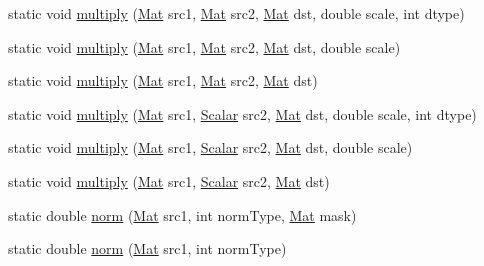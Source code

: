 \begin{DoxyCompactItemize}
static void \mbox{\hyperlink{classorg_1_1opencv_1_1core_1_1_core_aa49b10c74b442ec7cc890f9ce812918a}{multiply}} (\mbox{\hyperlink{classorg_1_1opencv_1_1core_1_1_mat}{Mat}} src1, \mbox{\hyperlink{classorg_1_1opencv_1_1core_1_1_mat}{Mat}} src2, \mbox{\hyperlink{classorg_1_1opencv_1_1core_1_1_mat}{Mat}} dst, double scale, int dtype)
\item 
static void \mbox{\hyperlink{classorg_1_1opencv_1_1core_1_1_core_ae8964daf7682cfd4170fae06b195939d}{multiply}} (\mbox{\hyperlink{classorg_1_1opencv_1_1core_1_1_mat}{Mat}} src1, \mbox{\hyperlink{classorg_1_1opencv_1_1core_1_1_mat}{Mat}} src2, \mbox{\hyperlink{classorg_1_1opencv_1_1core_1_1_mat}{Mat}} dst, double scale)
\item 
static void \mbox{\hyperlink{classorg_1_1opencv_1_1core_1_1_core_ad159823509d5f6cfac9839f7589f9a7e}{multiply}} (\mbox{\hyperlink{classorg_1_1opencv_1_1core_1_1_mat}{Mat}} src1, \mbox{\hyperlink{classorg_1_1opencv_1_1core_1_1_mat}{Mat}} src2, \mbox{\hyperlink{classorg_1_1opencv_1_1core_1_1_mat}{Mat}} dst)
\item 
static void \mbox{\hyperlink{classorg_1_1opencv_1_1core_1_1_core_a1b59367e832360dfa8cef944ecbc17ec}{multiply}} (\mbox{\hyperlink{classorg_1_1opencv_1_1core_1_1_mat}{Mat}} src1, \mbox{\hyperlink{classorg_1_1opencv_1_1core_1_1_scalar}{Scalar}} src2, \mbox{\hyperlink{classorg_1_1opencv_1_1core_1_1_mat}{Mat}} dst, double scale, int dtype)
\item 
static void \mbox{\hyperlink{classorg_1_1opencv_1_1core_1_1_core_a9ba18c691a0cb984dcb9408e3d6721fb}{multiply}} (\mbox{\hyperlink{classorg_1_1opencv_1_1core_1_1_mat}{Mat}} src1, \mbox{\hyperlink{classorg_1_1opencv_1_1core_1_1_scalar}{Scalar}} src2, \mbox{\hyperlink{classorg_1_1opencv_1_1core_1_1_mat}{Mat}} dst, double scale)
\item 
static void \mbox{\hyperlink{classorg_1_1opencv_1_1core_1_1_core_a248747a674dce2ed86c45e4d66caaddf}{multiply}} (\mbox{\hyperlink{classorg_1_1opencv_1_1core_1_1_mat}{Mat}} src1, \mbox{\hyperlink{classorg_1_1opencv_1_1core_1_1_scalar}{Scalar}} src2, \mbox{\hyperlink{classorg_1_1opencv_1_1core_1_1_mat}{Mat}} dst)
\item 
static double \mbox{\hyperlink{classorg_1_1opencv_1_1core_1_1_core_a282aac8c7806f10f75738bf8db3af7a8}{norm}} (\mbox{\hyperlink{classorg_1_1opencv_1_1core_1_1_mat}{Mat}} src1, int norm\+Type, \mbox{\hyperlink{classorg_1_1opencv_1_1core_1_1_mat}{Mat}} mask)
\item 
static double \mbox{\hyperlink{classorg_1_1opencv_1_1core_1_1_core_a622a34c86e60dff3ad3990cae4bc3766}{norm}} (\mbox{\hyperlink{classorg_1_1opencv_1_1core_1_1_mat}{Mat}} src1, int norm\+Type)

\end{DoxyCompactItemize}
